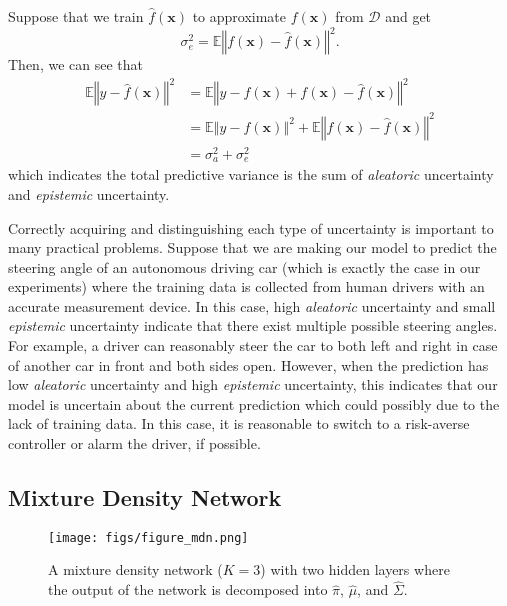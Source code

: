 \documentclass[letterpaper, 10 pt, conference]{ieeeconf}  %
\begin{document}
Suppose that we train $\hat{f}(\mathbf{x})$ to approximate $f(\mathbf{x})$ 
from $\mathcal{D}$ and get
\begin{equation*}
	\sigma_{e}^{2}
		=\mathbb{E}\left\Vert f(\mathbf{x})-\hat{f}(\mathbf{x})\right\Vert ^{2}.
\end{equation*}
Then, we can see that
\begin{align*}
	\mathbb{E}\left\Vert y-\hat{f}(\mathbf{x})\right\Vert ^{2} 
		& = \mathbb{E}\left\Vert y-f(\mathbf{x})+f(\mathbf{x})-\hat{f}(\mathbf{x})\right\Vert ^{2}
		\\
		&= \mathbb{E}\left\Vert y-f(\mathbf{x}) \right\Vert ^{2}
			+ \mathbb{E}\left\Vert  f(\mathbf{x}) - \hat{f}(\mathbf{x}) \right\Vert ^{2}
		\\
		&=\sigma_{a}^{2}+\sigma_{e}^{2}
\end{align*}
which indicates the total predictive variance is the sum of
\textit{aleatoric} uncertainty and \textit{epistemic} uncertainty. 


Correctly acquiring and distinguishing
each type of uncertainty is important to many practical problems. 
Suppose that we are making our model to predict the steering angle 
of an autonomous driving car 
(which is exactly the case in our experiments)
where the training data is collected from human drivers
with an accurate measurement device. 
In this case, 
high \textit{aleatoric} uncertainty and small \textit{epistemic} uncertainty
indicate that there exist multiple possible steering angles. 
For example, a driver can reasonably steer the car 
to both left and right in case of another car in front and both sides open. 
However, when the prediction has 
low \textit{aleatoric} uncertainty and high \textit{epistemic} uncertainty,
this indicates that our model
is uncertain about the current prediction
which could possibly due to the lack of training data.
In this case, it is reasonable to switch to a risk-averse controller
or alarm the driver, if possible. 


\subsection{Mixture Density Network} \label{subsec:mdn}



\begin{figure}[!t] \centering
	\texttt{[image: figs/figure\_mdn.png]}
	\caption{
		A mixture density network ($K=3$) with two hidden layers
		where the output of the network is decomposed into
		$\hat{\pi}$, $\hat{\mu}$, and $\hat{\Sigma}$. 
		}
	\label{fig:mdn}
\end{figure}
\end{document}
